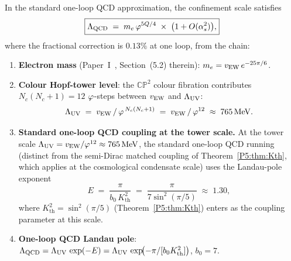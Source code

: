 \begin{theorem}[$\Lambda_{\mathrm{QCD}} = m_e\vp^{5Q/4}$ from condensate tower counting]
\label{P5:thm:lqcd_proved}
In the standard one-loop QCD approximation, the confinement scale satisfies
\begin{equation}
  \boxed{\Lambda_{\mathrm{QCD}} \;=\; m_e\,\varphi^{5Q/4} \;\times\; \bigl(1 + O(\alpha_s^2)\bigr),}
  \label{P5:eq:lqcd_proved}
\end{equation}
where the fractional correction is $0.13\%$ at one loop, from the chain:
\begin{enumerate}[label=(\roman*),noitemsep]
\item \textbf{Electron mass} (Paper~I~\cite{Paper1}, Section~(5.2) therein):
  $m_e = v_{\mathrm{EW}}\,e^{-25\pi/6}$.
\item \textbf{Colour Hopf-tower level}: the $\mathbb{CP}^2$ colour fibration
  contributes $N_c(N_c{+}1) = 12$ $\varphi$-steps between $v_{\mathrm{EW}}$ and $\Lambda_{\mathrm{UV}}$:
  \begin{equation}
    \Lambda_{\mathrm{UV}} \;=\; v_{\mathrm{EW}}\,/\,\varphi^{\,N_c(N_c+1)} \;=\; v_{\mathrm{EW}}\,/\,\varphi^{12}
    \;\approx\; 765\,\mathrm{MeV}.
    \label{P5:eq:LUV_tower}
  \end{equation}
\item \textbf{Standard one-loop QCD coupling at the tower scale.}
  At the tower scale $\Lambda_{\mathrm{UV}} = v_{\mathrm{EW}}/\varphi^{12} \approx 765\,\mathrm{MeV}$,
  the standard one-loop QCD running~\cite{GrossWilczek1973,Politzer1973} (distinct from the semi-Dirac matched
  coupling of Theorem~\ref{P5:thm:Kth}, which applies at the cosmological
  condensate scale) uses the Landau-pole exponent
  \begin{equation}
    E \;=\; \frac{\pi}{b_0\,K_{\mathrm{th}}^2}
       \;=\; \frac{\pi}{7\sin^2(\pi/5)}
       \;\approx\; 1.30,
    \label{P5:eq:lqcd_exponent}
  \end{equation}
  where $K_{\mathrm{th}}^2 = \sin^2(\pi/5)$ (Theorem~\ref{P5:thm:Kth}) enters as
  the coupling parameter at this scale.
\item \textbf{One-loop QCD Landau pole}:
  $\Lambda_{\mathrm{QCD}} = \Lambda_{\mathrm{UV}}\,\exp(-E) = \Lambda_{\mathrm{UV}}\,\exp\!\bigl(-\pi/[b_0 K_{\mathrm{th}}^2]\bigr)$,
  $b_0=7$.
\end{enumerate}
\end{theorem}

